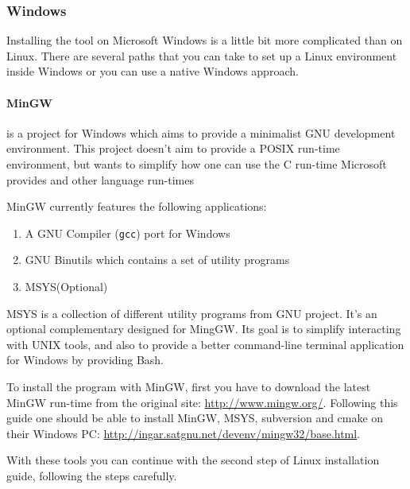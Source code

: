 \subsubsection{Windows}
\par Installing the tool on Microsoft Windows is a little bit more complicated than on Linux. There are several paths that you can take to set up a Linux environment inside Windows or you can use a native Windows approach. 
\paragraph{MinGW} is a project for Windows which aims to provide a minimalist GNU development environment\cite{mingw_homepage}. This project doesn't aim to provide a POSIX run-time environment\cite{mingw_homepage}, but wants to simplify how one can use the C run-time Microsoft provides and other language run-times \medskip
\par MinGW currently features the following applications:
\begin{enumerate}
	\item A GNU Compiler (\verb|gcc|) port for Windows
	\item GNU Binutils which contains a set of utility programs
	\item MSYS(Optional)
\end{enumerate}
\par MSYS is a collection of different utility programs from GNU project. It's an optional complementary designed for MingGW\cite{mysis_page}. Its goal is to simplify interacting with UNIX tools, and also to provide a better command-line terminal application for Windows by providing Bash. \medskip
\par To install the program with MinGW, first you have to download the latest MinGW run-time from the original site: \url{http://www.mingw.org/}. Following this guide one should be able to install MinGW, MSYS, subversion and cmake on their Windows PC: \url{http://ingar.satgnu.net/devenv/mingw32/base.html}. \medskip
\par With these tools you can continue with the second step of Linux installation guide, following the steps carefully. \medskip
